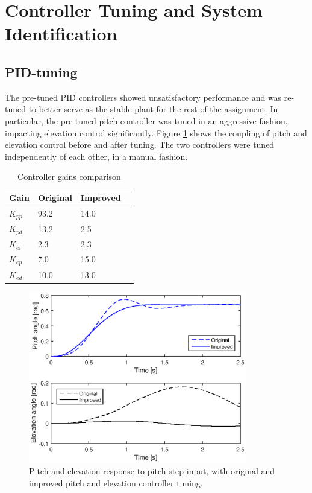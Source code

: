 \section{Controller Tuning and System Identification}\label{sec:prob1}
\label{text:problem1}

\subsection{PID-tuning}
The pre-tuned PID controllers showed unsatisfactory performance and was re-tuned to better serve as the stable plant for the rest of the assignment. In particular, the pre-tuned pitch controller was tuned in an aggressive fashion, impacting elevation control significantly. Figure \ref{fig:pid_tuning} shows the coupling of pitch and elevation control before and after tuning. The two controllers were tuned independently of each other, in a manual fashion.

\begin{table}[hp]
	\centering
	\caption{Controller gains comparison}
	\begin{tabular}{llll}
		\hline
		Gain & Original & Improved \\
		\hline
		$K_{pp}$ & 93.2 & 14.0 \\
		$K_{pd}$ & 13.2 & 2.5 \\
		$K_{ei}$ & 2.3 & 2.3 \\
		$K_{ep}$ & 7.0 & 15.0 \\
		$K_{ed}$ & 10.0 & 13.0 \\
	\end{tabular}
	\label{tab:gains}
\end{table}

\begin{figure}[hp]
	\centering
		\includegraphics[width=0.85\textwidth]{figures/1/pid_tuning.eps}
	\caption{Pitch and elevation response to pitch step input, with original and improved pitch and elevation controller tuning.}
	\label{fig:pid_tuning}
\end{figure}


